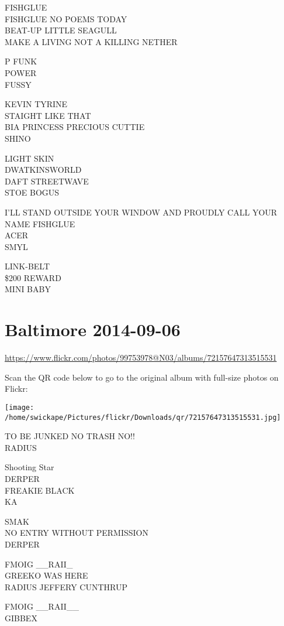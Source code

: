 \documentclass[10pt,letterpaper]{article}
\begin{document}
FISHGLUE\\
FISHGLUE NO POEMS TODAY\\
BEAT{-}UP LITTLE SEAGULL\\
MAKE A LIVING NOT A KILLING NETHER

P FUNK\\
POWER\\
FUSSY

KEVIN TYRINE\\
STAIGHT LIKE THAT\\
BIA PRINCESS PRECIOUS CUTTIE\\
SHINO

LIGHT SKIN\\
DWATKINSWORLD\\
DAFT STREETWAVE\\
STOE BOGUS

I'LL STAND OUTSIDE YOUR WINDOW AND PROUDLY CALL YOUR NAME FISHGLUE\\
ACER\\
SMYL

LINK{-}BELT\\
\$200 REWARD\\
MINI BABY
\pagebreak

\section*{Baltimore 2014-09-06}

\url{https://www.flickr.com/photos/99753978@N03/albums/72157647313515531}

Scan the QR code below to go to the original album with full-size photos on Flickr:

\texttt{[image: /home/swickape/Pictures/flickr/Downloads/qr/72157647313515531.jpg]}
\pagebreak

TO BE JUNKED NO TRASH NO!!\\
RADIUS

Shooting Star\\
DERPER\\
FREAKIE BLACK\\
KA

SMAK\\
NO ENTRY WITHOUT PERMISSION\\
DERPER

FMOIG \_\_RAII\_\\
GREEKO WAS HERE\\
RADIUS JEFFERY CUNTHRUP

FMOIG \_\_RAII\_\_\\
GIBBEX
\end{document}
